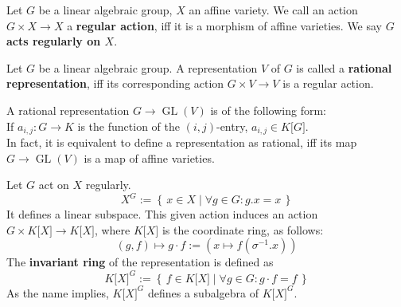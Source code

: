 \begin{definition}
  Let $G$ be a linear algebraic group, $X$ an affine variety.
  We call an action $G \times X \longrightarrow X$ a \textbf{regular action}, iff it is a morphism of affine varieties.
  We say \textbf{$ G $ acts regularly on $ X $}.
\end{definition}

\begin{definition}
  Let $G$ be a linear algebraic group.
  A representation $V$ of $G$ is called a \textbf{rational representation}, iff its corresponding action $ G \times V \longrightarrow V $ is a regular action.
\end{definition}

\begin{remark}
  A rational representation $ G \longrightarrow \operatorname{GL}\left(V\right) $ is of the following form:\\
  If $ a_{i,j} : G \longrightarrow K $ is the function of the $\left( i,j \right) $-entry, $ a_{i,j} \in K\lbrack G\rbrack $.\\
  In fact, it is equivalent to define a representation as rational, iff its map $ G \longrightarrow \operatorname{GL} \left( V \right) $ is a map of affine varieties.
\end{remark}

\begin{definition}[Invariants]
  Let $ G $ act on $ X $ regularly.
  \begin{equation}
    X^G := \left\{\, x \in X \mid \forall g \in G : g . x = x \,\right\}
  \end{equation}
  It defines a linear subspace.
  This given action induces an action $ G \times K\lbrack X\rbrack \longrightarrow K\lbrack X\rbrack $, where $K\lbrack X\rbrack$ is the coordinate ring, as follows:
  \begin{equation}
    \left( g , f \right) \longmapsto g \cdot f :=
    \left( x \mapsto f \left( \sigma^{-1} . x \right) \right)
  \end{equation}
  The \textbf{invariant ring} of the representation is defined as
  \begin{equation}
    K\lbrack X\rbrack^G := \left\{ \, f \in K\lbrack X \rbrack \mid \forall g \in G : g \cdot f = f \, \right\}
  \end{equation}
  As the name implies, $ K\lbrack X\rbrack^G $ defines a subalgebra of $ K\lbrack X\rbrack^G $.
\end{definition}

